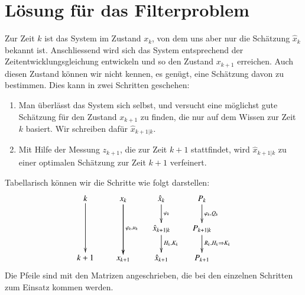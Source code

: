 \section{Lösung für das Filterproblem}
Zur Zeit $k$ ist das System im Zustand $x_k$, von dem uns aber nur die
Schätzung $\hat x_k$ bekannt ist.
Anschliessend wird sich
das System entsprechend der Zeitentwicklungsgleichung entwickeln und
so den Zustand $x_{k+1}$ erreichen.
Auch diesen Zustand können wir nicht
kennen, es genügt, eine Schätzung davon zu bestimmen.
Dies kann in zwei
Schritten geschehen:
\begin{enumerate}
\item Man überlässt das System sich selbst, und versucht eine möglichst
gute Schätzung für den Zustand $x_{k+1}$ zu finden, die nur auf dem
Wissen zur Zeit $k$ basiert.
Wir schreiben dafür $\hat x_{k+1|k}$.
\item Mit Hilfe der Messung $z_{k+1}$, die zur Zeit $k+1$ stattfindet, wird
$\hat x_{k+1|k}$ zu einer optimalen Schätzung zur Zeit $k+1$ verfeinert.
\end{enumerate}
Tabellarisch können wir die Schritte wie folgt darstellen:
\[
\xymatrix @-1mm {
k\ar[dd]&x_k\ar[dd]\ar[dd]^{\varphi_k, u_k} &\hat x_k\ar[d]^{\varphi_k}      &P_{k} \ar[d]^{\varphi_k,Q_k}    \\
        &           &\hat x_{k+1|k}\ar[d]^{H_k,K_k}&P_{k+1|k}\ar[d]^{R_k,H_k\Rightarrow K_k} \\
k+1     &x_{k+1}    &\hat x_{k+1}  &P_{k+1}
} \]
Die Pfeile sind mit den Matrizen angeschrieben, die bei den einzelnen Schritten zum
Einsatz kommen werden.

